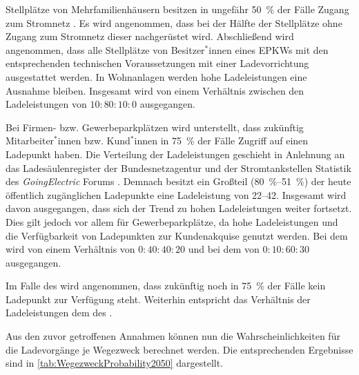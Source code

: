Stellplätze von Mehrfamilienhäusern besitzen in ungefähr \SI{50}{\percent} der Fälle Zugang zum Stromnetz \cite{dena2020}.
Es wird angenommen, dass bei der Hälfte der Stellplätze ohne Zugang zum Stromnetz dieser nachgerüstet wird.
Abschließend wird angenommen, dass alle Stellplätze von Besitzer$^*$innen eines \glspl{EPKW} mit den entsprechenden technischen Voraussetzungen mit einer Ladevorrichtung ausgestattet werden.
In Wohnanlagen werden hohe Ladeleistungen eine Ausnahme bleiben.
Insgesamt wird von einem Verhältnis zwischen den Ladeleistungen von \(10:80:10:0\) ausgegangen.\medskip

Bei Firmen- bzw. Gewerbeparkplätzen wird unterstellt, dass zukünftig Mitarbeiter$^*$innen bzw. Kund$^*$innen in \SI{75}{\percent} der Fälle Zugriff auf einen Ladepunkt haben.
Die Verteilung der Ladeleistungen geschieht in Anlehnung an das Ladesäulenregister der Bundesnetzagentur \cite[][Stand: ]{BundesnetzagenturElektrizitaet2020} und der Stromtankstellen Statistik des \textit{GoingElectric} Forums \cite[][Stand: ]{Weemaes2020}.
Demnach besitzt ein Großteil (\SIrange[range-phrase=~bzw.~]{80}{51}{\percent}) der heute öffentlich zugänglichen Ladepunkte eine Ladeleistung von \SIrange{22}{42}{\kw}.
Insgesamt wird davon ausgegangen, dass sich der Trend zu hohen Ladeleistungen weiter fortsetzt.
Dies gilt jedoch vor allem für Gewerbeparkplätze, da hohe Ladeleistungen und die Verfügbarkeit von Ladepunkten zur Kundenakquise genutzt werden.
Bei dem \UC \Firmeparkplatz wird von einem Verhältnis von \(0:40:40:20\) und bei dem \UC \Gewerbeparkplatz von \(0:10:60:30\) ausgegangen.\medskip

Im Falle des \UC \Straszenrand wird angenommen, dass zukünftig noch in \SI{75}{\percent} der Fälle kein Ladepunkt zur Verfügung steht.
Weiterhin entspricht das Verhältnis der Ladeleistungen dem des \UC \Firmeparkplatzdot.\medskip

Aus den zuvor getroffenen Annahmen können nun die Wahrscheinlichkeiten für die Ladevorgänge je Wegezweck berechnet werden.
Die entsprechenden Ergebnisse sind in \autoref{tab:WegezweckProbability2050} dargestellt.




